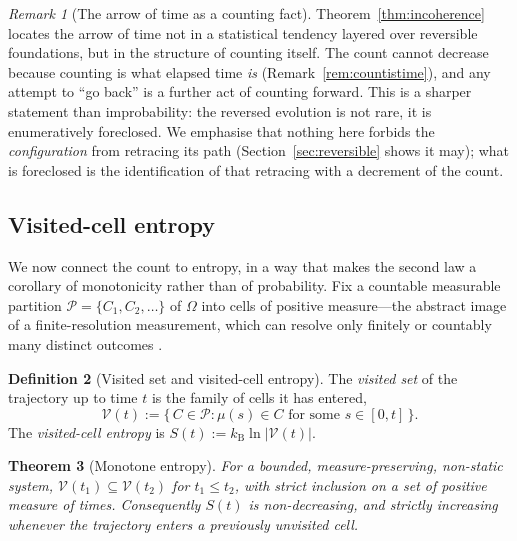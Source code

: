 \documentclass[11pt,a4paper]{article}
\theoremstyle{thmstyle}
\newtheorem{theorem}{Theorem}[section]
\theoremstyle{definition}
\newtheorem{definition}[theorem]{Definition}
\theoremstyle{remark}
\newtheorem{remark}[theorem]{Remark}
\newcommand{\kB}{k_{\mathrm{B}}}
\newcommand{\Mic}{\mu}
\newcommand{\Vis}{\mathcal{V}}
\begin{document}
\begin{remark}[The arrow of time as a counting fact]
\label{rem:arrow}
Theorem~\ref{thm:incoherence} locates the arrow of time not in a
statistical tendency layered over reversible foundations, but in the
structure of counting itself. The count cannot decrease because counting
is what elapsed time \emph{is} (Remark~\ref{rem:countistime}), and any
attempt to ``go back'' is a further act of counting forward. This is a
sharper statement than improbability: the reversed evolution is not rare,
it is enumeratively foreclosed. We emphasise that nothing here forbids the
\emph{configuration} from retracing its path (Section~\ref{sec:reversible}
shows it may); what is foreclosed is the identification of that retracing
with a decrement of the count.
\end{remark}

\subsection{Visited-cell entropy}
\label{sec:entropy}

We now connect the count to entropy, in a way that makes the second law a
corollary of monotonicity rather than of probability. Fix a countable
measurable partition $\mathcal{P}=\{C_1,C_2,\dots\}$ of $\Omega$ into
cells of positive measure---the abstract image of a finite-resolution
measurement, which can resolve only finitely or countably many distinct
outcomes \citep{shannon1948,cover2006}.

\begin{definition}[Visited set and visited-cell entropy]
\label{def:visited}
The \emph{visited set} of the trajectory up to time $t$ is the family of
cells it has entered,
\begin{equation}
\Vis(t):=\{\,C\in\mathcal{P} : \Mic(s)\in C\text{ for some }s\in[0,t]\,\}.
\label{eq:visited}
\end{equation}
The \emph{visited-cell entropy} is $S(t):=\kB\ln|\Vis(t)|$.
\end{definition}

\begin{theorem}[Monotone entropy]
\label{thm:entropy}
For a bounded, measure-preserving, non-static system,
$\Vis(t_1)\subseteq\Vis(t_2)$ for $t_1\leq t_2$, with strict inclusion on
a set of positive measure of times. Consequently $S(t)$ is non-decreasing,
and strictly increasing whenever the trajectory enters a previously
unvisited cell.
\end{theorem}
\end{document}
